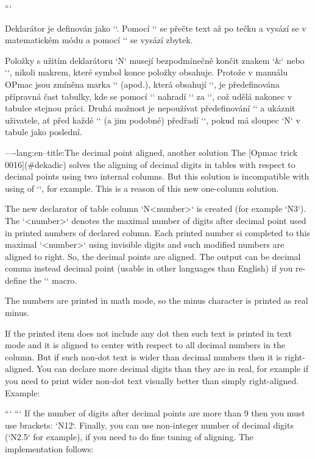 ```

Deklarátor je definován jako `\paramtabdeclareN`. Pomocí `\aligndecdigit` se
přečte text až po tečku a vysází se v matematickém módu a pomocí
`\aligndecdigitA` se vysází zbytek.

Položky s užitím deklarátoru `N` musejí bezpodmínečně končit znakem `&` nebo
`\cr`, nikoli makrem, které symbol konce položky obsahuje. Protože v manuálu
OPmac jsou zmíněna marka `\crl` (apod.), která obsahují `\cr`, je
předefinována přípravná čast tabulky, kde se pomocí `\replacestrings`
nahradí `\crl` za `\crcr\crl`, což udělá nakonec v tabulce stejnou práci. Druhá
možnost je nepoužívat předefinování `\tableA` a ukáznit uživatele, ať před
každé `\crl` (a jim podobné) předřadí `\cr`, pokud má sloupec `N` v tabule
jako poslední.


----lang:en--title:The decimal point aligned, another solution
The [Opmac trick 0016](#dekadic) solves the aligning of decimal
digits in tables with respect to decimal points using two internal columns.
But this solution is incompatible with using of `\tskip`, for example. This
is a reason of this new one-column solution. 

The new declarator of table column `N<number>` is created (for example
`N3`). The `<number>` denotes the maximal number of digits after decimal
point used in printed numbers of declared column. Each printed number si completed to this
maximal `<number>` using invisible digits and such modified numbers are aligned 
to right. So, the decimal points are aligned. The output can be decimal comma
instead decimal point (usable in other languages than English) if you re-define the
`\decimalpoint` macro.

The numbers are printed in math mode, so the minus character is printed as
real minus.

If the printed item does not include any dot then such text is printed in
text mode and it is aligned to center with respect to all decimal numbers in
the column. But if such non-dot text is wider than decimal numbers then it is
right-aligned. You can declare more decimal digits than they are in real, for
example if you need to print wider non-dot text visually better than
simply right-aligned. Example:

```
```
If the number of digits after decimal points are more than 9 then you must
use brackets: `N{12}`. Finally, you can use non-integer number of decimal
digits (`N{2.5}` for example), if you need to do fine tuning of aligning.
The implementation follows:

